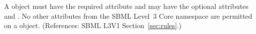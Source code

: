 A \RateRule object must have the required attribute  and
may have the optional attributes   and .  No
other attributes from the SBML Level~3 Core namespace are permitted on a
\RateRule object.  (References: SBML L3V1 Section~\ref{sec:rules}.)

